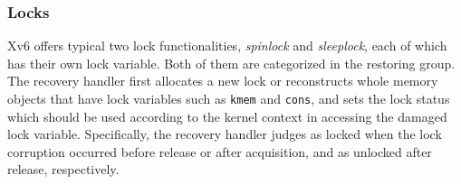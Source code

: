 \subsubsection{Locks}
\label{subsec:recoveryhandlerLock}
Xv6 offers typical two lock functionalities, \emph{spinlock} and \emph{sleeplock}, each of which has their own lock variable.
Both of them are categorized in the restoring group.
The recovery handler first allocates a new lock or reconstructs whole memory objects that have lock variables such as \texttt{kmem} and \texttt{cons}, and sets the lock status which should be used according to the kernel context in accessing the damaged lock variable. Specifically, the recovery handler judges as locked when the lock corruption occurred before release or after acquisition, and as unlocked after release, respectively.



